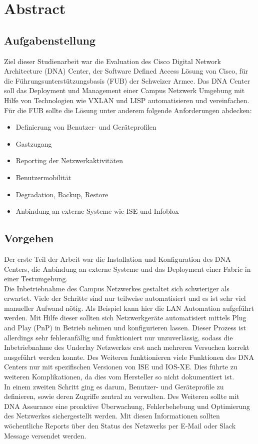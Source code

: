 \section{Abstract}

\subsection{Aufgabenstellung}

Ziel dieser Studienarbeit war die Evaluation des Cisco Digital Network Architecture (DNA) Center, der Software Defined Access Lösung von Cisco, für die Führungsunterstützungsbasis (FUB) der Schweizer Armee. Das DNA Center soll das Deployment und Management einer Campus Netzwerk Umgebung mit Hilfe von Technologien wie VXLAN und LISP automatisieren und vereinfachen.\\
Für die FUB sollte die Lösung unter anderem folgende Anforderungen abdecken:
\begin{itemize}
	\item Definierung von Benutzer- und Geräteprofilen
	\item Gastzugang
	\item Reporting der Netzwerkaktivitäten
	\item Benutzermobilität
	\item Degradation, Backup, Restore
	\item Anbindung an externe Systeme wie ISE und Infoblox
\end{itemize}

\subsection{Vorgehen}
Der erste Teil der Arbeit war die Installation und Konfiguration des DNA Centers, die Anbindung an externe Systeme und das Deployment einer Fabric in einer Testumgebung.\\
Die Inbetriebnahme des Campus Netzwerkes gestaltet sich schwieriger als erwartet. Viele der Schritte sind nur teilweise automatisiert und es ist sehr viel manueller Aufwand nötig. Als Beispiel kann hier die LAN Automation aufgeführt werden. Mit Hilfe dieser sollten sich Netzwerkgeräte automatisiert mittels Plug and Play (PnP) in Betrieb nehmen und konfigurieren lassen. Dieser Prozess ist allerdings sehr fehleranfällig und funktioniert nur unzuverlässig, sodass die Inbetriebnahme des Underlay Netzwerkes erst nach mehreren Versuchen korrekt ausgeführt werden konnte. 
Des Weiteren funktionieren viele Funktionen des DNA Centers nur mit spezifischen Versionen von ISE und IOS-XE. Dies führte zu weiteren Komplikationen, da dies vom Hersteller so nicht dokumentiert ist. \\
In einem zweiten Schritt ging es darum, Benutzer- und Geräteprofile zu definieren, sowie deren Zugriffe zentral zu verwalten. Des Weiteren sollte mit DNA Assurance eine proaktive Überwachung, Fehlerbehebung und Optimierung des Netzwerkes sichergestellt werden. Mit diesen Informationen sollten wöchentliche Reports über den Status des Netzwerks per E-Mail oder Slack Message versendet werden.
